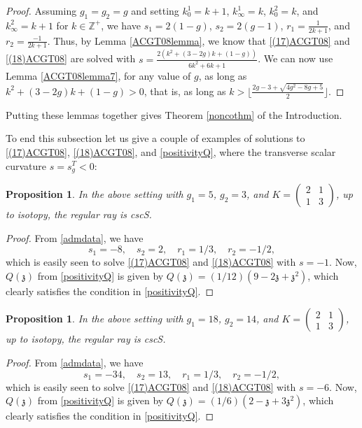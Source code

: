 \documentclass[12pt]{amsart}
\newtheorem{proposition}[theorem]{Proposition}
\def\bbz{{\mathbb Z}}
\def\gz{{\mathfrak z}}
\begin{document}
\begin{proof}
Assuming $g_1=g_2=g$ and setting $k_0^1=k+1$, $k_\infty^1=k$, $k_0^2=k$, and $k_\infty^2=k+1$ for $k\in\bbz^{+}$, we have
$s_1=2(1-g)$, $s_2=2(g-1)$, $r_1=\frac{1}{2k+1}$, and $r_2=\frac{-1}{2k+1}$. Thus, by Lemma \ref{ACGT08lemma}, we know  that
 \eqref{(17)ACGT08} and \eqref{(18)ACGT08} are solved with $s=\frac{2(k^2+(3-2g)k+(1-g))}{6k^2+6k+1}$. We can now use Lemma \ref{ACGT08lemma7}, for any value of $g$, as long as $k^2+(3-2g)k+(1-g)>0$, that is, as long as $k> \lfloor\frac{2 g-3 +\sqrt{4 g^2-8 g+5}}{2} \rfloor$.
\end{proof}

Putting these lemmas together gives Theorem \ref{noncothm} of the Introduction. 

To end this subsection let us give a couple of examples of solutions to \eqref{(17)ACGT08}, \eqref{(18)ACGT08},  and \eqref{positivityQ}, where the transverse scalar curvature $s=s^T_g<0$:

\begin{proposition}\label{randomcscS}
In the above setting with $g_1= 5$, $g_2=3$, and
 $K= \begin{pmatrix}
     2 & 1 \\
1 & 3
\end{pmatrix}$, up to isotopy, the regular ray is cscS.
\end{proposition}

\begin{proof}
From \eqref{admdata}, we have
$$s_1=-8,\quad s_2=2, \quad r_1=1/3, \quad r_2=-1/2,$$
which is easily seen to solve \eqref{(17)ACGT08} and \eqref{(18)ACGT08} with $s=-1$. Now,
$Q(\gz)$ from \eqref{positivityQ} is given by $Q(\gz) = (1/12) (9 - 2 \gz + \gz^2)$, which clearly satisfies the condition in \eqref{positivityQ}.
\end{proof}

\begin{proposition}\label{randomcscS2}
In the above setting with $g_1= 18$, $g_2=14$, and
 $K= \begin{pmatrix}
     2 & 1 \\
1 & 3
\end{pmatrix}$, up to isotopy, the regular ray is cscS.
\end{proposition}

\begin{proof}
From \eqref{admdata}, we have
$$s_1=-34,\quad s_2=13, \quad r_1=1/3, \quad r_2=-1/2,$$
which is easily seen to solve \eqref{(17)ACGT08} and \eqref{(18)ACGT08} with $s=-6$. Now,
$Q(\gz)$ from \eqref{positivityQ} is given by $Q(\gz) = (1/6) (2 -  \gz +3 \gz^2)$, which clearly satisfies the condition in \eqref{positivityQ}.
\end{proof}
\end{document}
